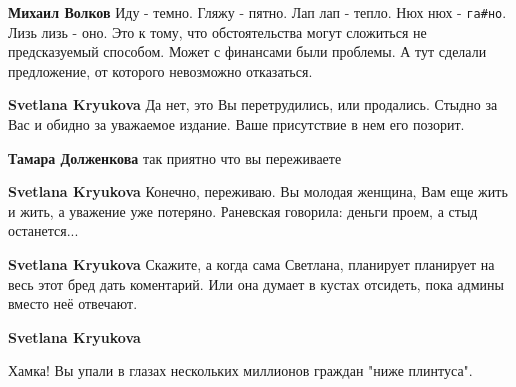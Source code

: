 \begin{itemize}
\begin{itemize}
\textbf{Михаил Волков} Иду - темно. Гляжу - пятно. Лап лап - тепло. Нюх нюх - \verb|га#но|. Лизь лизь - оно. Это к тому, что обстоятельства могут сложиться не предсказуемый способом. Может с финансами были проблемы. А тут сделали предложение, от которого невозможно отказаться.

 
\textbf{Svetlana Kryukova} Да нет, это Вы перетрудились, или продались. Стыдно за Вас и обидно за уважаемое издание. Ваше присутствие в нем его позорит.


 
\textbf{Тамара Долженкова} так приятно что вы переживаете

 
\textbf{Svetlana Kryukova} Конечно, переживаю. Вы молодая женщина, Вам еще жить и жить, а уважение уже потеряно. Раневская говорила: деньги проем, а стыд останется...

 
\textbf{Svetlana Kryukova} Скажите, а когда сама Светлана, планирует планирует на весь этот бред дать коментарий. Или она думает в кустах отсидеть, пока админы вместо неё отвечают.

 
\textbf{Svetlana Kryukova} 

Хамка! Вы упали в глазах нескольких миллионов граждан "ниже плинтуса". 


\end{itemize}
\end{itemize}
